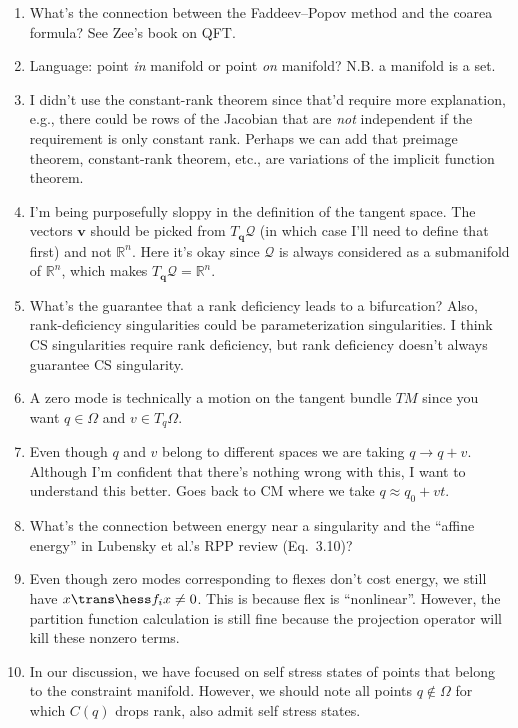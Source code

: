 \begin{enumerate}

  \item What's the connection between the Faddeev--Popov method and the coarea formula?  See Zee's book on QFT.
  \item Language: point \emph{in} manifold or point \emph{on} manifold? N.B. a manifold is a set.
  \item I didn't use the constant-rank theorem since that'd require more explanation, e.g., there could be rows of the Jacobian that are \emph{not} independent if the requirement is only constant rank.  Perhaps we can add that preimage theorem, constant-rank theorem, etc., are variations of the implicit function theorem.
  \item I'm being purposefully sloppy in the definition of the tangent space.
    The vectors $\bm{v}$ should be picked from $T_{\bm{q}} \mathcal{Q}$ (in which case I'll need to define that first) and not $\mathbb{R}^n$.
    Here it's okay since $\mathcal{Q}$ is always considered as a submanifold of $\mathbb{R}^n$, which makes $T_{\bm{q}}\mathcal{Q} = \mathbb{R}^n$.
  \item What's the guarantee that a rank deficiency leads to a bifurcation?  Also, rank-deficiency singularities could be parameterization singularities.  I think CS singularities require rank deficiency, but rank deficiency doesn't always guarantee CS singularity.
  \item A zero mode is technically a motion on the tangent bundle $TM$ since you want $q \in \Omega$ and $v \in T_{q}\Omega$.
  \item Even though $q$ and $v$ belong to different spaces we are taking $q \to q + v$.  Although I'm confident that there's nothing wrong with this, I want to understand this better.  Goes back to CM where we take $q \approx q_0 + v t$.
  \item What's the connection between energy near a singularity and the ``affine energy'' in Lubensky et al.'s RPP review (Eq.~3.10)?
  \item Even though zero modes corresponding to flexes don't cost energy, we still have $x\trans\hess f_ix \neq 0$.  This is because flex is ``nonlinear''.  However, the partition function calculation is still fine because the projection operator will kill these nonzero terms.
  \item In our discussion, we have focused on self stress states of points that belong to the constraint manifold.
  However, we should note all points $q \notin \Omega$ for which $C(q)$ drops rank, also admit self stress states.

\end{enumerate}
